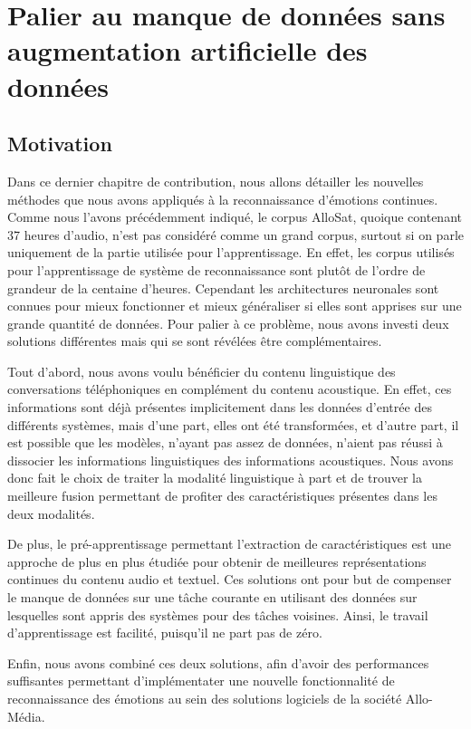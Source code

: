 \chapter{Palier au manque de données sans augmentation artificielle des données}

\label{chapitre6}

\section{Motivation}

Dans ce dernier chapitre de contribution, nous allons détailler les nouvelles méthodes que nous avons appliqués à la reconnaissance d'émotions continues. Comme nous l'avons précédemment indiqué, le corpus AlloSat, quoique contenant 37 heures d'audio, n'est pas considéré comme un grand corpus, surtout si on parle uniquement de la partie utilisée pour l'apprentissage. En effet, les corpus utilisés pour l'apprentissage de système de reconnaissance sont plutôt de l'ordre de grandeur de la centaine d'heures. Cependant les architectures neuronales sont connues pour mieux fonctionner et mieux généraliser si elles sont apprises sur une grande quantité de données. Pour palier à ce problème, nous avons investi deux solutions différentes mais qui se sont révélées être complémentaires.

Tout d'abord, nous avons voulu bénéficier du contenu linguistique des conversations téléphoniques en complément du contenu acoustique.
En effet, ces informations sont déjà présentes implicitement dans les données d'entrée des différents systèmes, mais d'une part, elles ont été transformées, et d'autre part, il est possible que les modèles, n'ayant pas assez de données, n'aient pas réussi à dissocier les informations linguistiques des informations acoustiques. Nous avons donc fait le choix de traiter la modalité linguistique à part et de trouver la meilleure fusion permettant de profiter des caractéristiques présentes dans les deux modalités.

De plus, le pré-apprentissage permettant l'extraction de caractéristiques est une approche de plus en plus étudiée pour obtenir de meilleures représentations continues du contenu audio et textuel. Ces solutions ont pour but de compenser le manque de données sur une tâche courante en utilisant des données sur lesquelles sont appris des systèmes pour des tâches voisines. Ainsi, le travail d'apprentissage est facilité, puisqu'il ne part pas de zéro.

Enfin, nous avons combiné ces deux solutions, afin d'avoir des performances suffisantes permettant d'implémentater une nouvelle fonctionnalité de reconnaissance des émotions au sein des solutions logiciels de la société Allo-Média.


